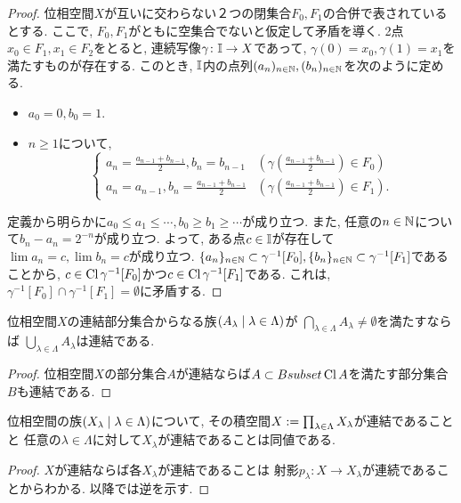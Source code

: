 \documentclass[uplatex, dvipdfmx, a4paper, 12pt, class=jsbook, crop=false]{standalone}
\begin{document}
\begin{proof}
	位相空間$ X $が互いに交わらない２つの閉集合$ F_0, F_1 $の合併で表されているとする.
	ここで, $ F_0, F_1 $がともに空集合でないと仮定して矛盾を導く.
	2点$ x_0 \in F_1, x_1 \in F_2 $をとると, 連続写像$ \gamma \colon \mathbb{I} \to X $であって,
	$ \gamma(0) = x_0, \gamma(1) = x_1 $を満たすものが存在する.
	このとき, $ \mathbb{I} $内の点列$ (a_n)_{n\in \mathbb{N}}, (b_n)_{n \in \mathbb{N}} $を次のように定める.
	\begin{itemize}
		\item $ a_0 = 0, b_0 = 1 $.
		\item $ n \geq 1 $について,
		\begin{equation}
			\begin{cases}
				a_n = \frac{a_{n-1} + b_{n-1}}{2}, b_n = b_{n-1} & (\gamma\left(\frac{a_{n-1} + b_{n-1}}{2}\right) \in F_0) \\
				a_n = a_{n-1}, b_n = \frac{a_{n-1} + b_{n-1}}{2} & (\gamma\left(\frac{a_{n-1} + b_{n-1}}{2}\right) \in F_1).
			\end{cases}
		\end{equation}
	\end{itemize}
	定義から明らかに$ a_0 \leq a_1 \leq \cdots, b_0 \geq b_1 \geq \cdots $が成り立つ.
	また, 任意の$ n \in \mathbb{N} $について$ b_n - a_n = 2^{-n} $が成り立つ.
	よって, ある点$ c \in \mathbb{I} $が存在して$ \lim a_n = c, \lim b_n = c $が成り立つ.
	$ \{a_n\}_{n \in \mathbb{N}} \subset \gamma^{-1}[F_0], \{b_n\}_{n \in \mathbb{N}} \subset \gamma^{-1}[F_1] $であることから,
	$ c \in \mathop{\mathrm{Cl}}\nolimits{\gamma^{-1}[F_0]} $かつ$ c \in \mathop{\mathrm{Cl}}\nolimits{\gamma^{-1}[F_1]} $である.
	これは, $ \gamma^{-1}[F_0] \cap \gamma^{-1}[F_1] = \emptyset $に矛盾する.
\end{proof}

\begin{proposition}
	\label{prop:Sum of every connected subsets in a family having intersection is connected}
	位相空間$ X $の連結部分集合からなる族$ \setfamily{A_\lambda}{\lambda \in \Lambda} $が
	$ \bigcap_{\lambda \in \Lambda} A_\lambda \neq \emptyset $を満たすならば
	$ \bigcup_{\lambda \in \Lambda} A_\lambda $は連結である.
\end{proposition}

\begin{proof}
	\label{prop:Closure of a connected subspace is connected}
	位相空間$ X $の部分集合$ A $が連結ならば$ A \subset B subset \mathop{\mathrm{Cl}}\nolimits A $を満たす部分集合$ B $も連結である.
\end{proof}

\begin{proposition}
	\label{prop:A product space of connected spaces is connected}
	位相空間の族$ \setfamily{X_\lambda}{\lambda \in \Lambda} $について,
	その積空間$ X \mathrel{:=} \prod_{\lambda \in \Lambda} X_\lambda $が連結であることと
	任意の$ \lambda \in \Lambda $に対して$ X_\lambda $が連結であることは同値である.
\end{proposition}

\begin{proof}
	$ X $が連結ならば各$ X_\lambda $が連結であることは
	射影$ p_\lambda \colon X \to X_\lambda $が連続であることからわかる.
	以降では逆を示す.
	\WIP
\end{proof}
\end{document}
